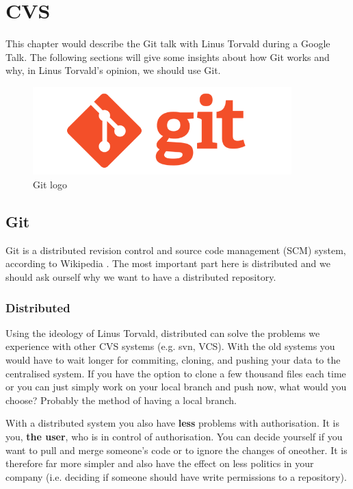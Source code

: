 \chapter{CVS}
\label{chap:cvs}
This chapter would describe the Git talk \cite{linus-git} with Linus Torvald during a Google Talk. The following sections will give some insights about how Git works and why, in Linus Torvald's opinion, we should use Git.

\begin{figure}[ht]
\begin{center}
\includegraphics[width=10cm]{Chapters/06_git_logo.png}
\end{center}
\caption{Git logo\protect\footnotemark}
\label{img:git-logo}
\end{figure}


\section{Git}
\label{sec:git}
Git is a distributed revision control and source code management (SCM) system, according to Wikipedia \cite{git-wiki}. The most important part here is distributed and we should ask ourself why we want to have a distributed repository.

\subsection{Distributed}
\label{sec:git-distributed}
Using the ideology of Linus Torvald, distributed can solve the problems we experience with other CVS systems (e.g. svn, VCS). With the old systems you would have to wait longer for commiting, cloning, and pushing your data to the centralised system. If you have the option to clone a few thousand files each time or you can just simply work on your local branch and  push now, what would you choose? Probably the method of having a local branch.

With a distributed system you also have \textbf{less} problems with authorisation. It is you, \textbf{the user}, who is in control of authorisation. You can decide yourself if you want to pull and merge someone's code or to ignore the changes of oneother. It is therefore far more simpler and also have the effect on less politics in your company (i.e. deciding if someone should have write permissions to a repository).

